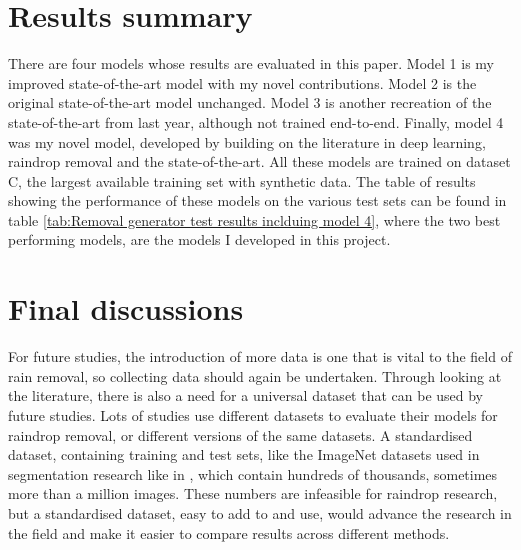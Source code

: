 \documentclass[11pt]{ociamthesis}  %
\begin{document}
\section{Results summary}
There are four models whose results are evaluated in this paper. Model 1 is my improved state-of-the-art model with my novel contributions. Model 2 is the original state-of-the-art model unchanged. Model 3 is another recreation of the state-of-the-art from last year, although not trained end-to-end. Finally, model 4 was my novel model, developed by building on the literature in deep learning, raindrop removal and the state-of-the-art. All these models are trained on dataset C, the largest available training set with synthetic data. The table of results showing the performance of these models on the various test sets can be found in table \ref{tab:Removal generator test results inclduing model 4}, where the two best performing models, are the models I developed in this project.

\section{Final discussions}
For future studies, the introduction of more data is one that is vital to the field of rain removal, so collecting data should again be undertaken. Through looking at the literature, there is also a need for a universal dataset that can be used by future studies. Lots of studies use different datasets to evaluate their models for raindrop removal, or different versions of the same datasets. A standardised dataset, containing training and test sets, like the ImageNet datasets used in segmentation research like in \cite{Gao_2023}, which contain hundreds of thousands, sometimes more than a million images. These numbers are infeasible for raindrop research, but a standardised dataset, easy to add to and use, would advance the research in the field and make it easier to compare results across different methods.
\end{document}
